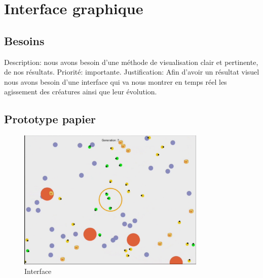 \section{Interface graphique}
\subsection{Besoins}
Description: nous avons besoin d'une méthode de visualisation clair et pertinente, de nos résultats.
Priorité: importante.
Justification: Afin d’avoir un résultat visuel nous avons besoin d’une interface qui va nous 
montrer en temps réel les agissement des créatures ainsi que leur évolution.

\subsection{Prototype papier}
\begin{figure}[H]
    \centering
    \includegraphics[width=0.8\textwidth]{./pictures/prototype.png}
    \caption{Interface}
\end{figure}


\clearpage
